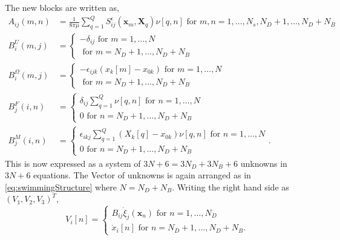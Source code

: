 The new blocks are written as,
\begin{equation*}
\begin{aligned}
A_{ij}(m,n) &= \frac{1}{8\pi\mu} \sum_{q=1}^Q S_{ij}^\epsilon (\bm{x}_m,\bm{X}_{q})\nu[q,n] \text { for } m,n = 1,\dots,N_s,N_D+1,\dots,N_D+N_B  \\
B_{i}^{U}(m,j) &= \begin{cases} -\delta_{ij} \text { for } m = 1,\dots,N \\ \text { for } m = N_D+1,\dots,N_D+N_B\end{cases}\\
B_{i}^{\Omega}(m,j) &= \begin{cases} -\epsilon_{ijk}(x_k[m]-x_{0k}) \text { for } m = 1,\dots,N \\ \text { for } m = N_D+1,\dots,N_D+N_B\end{cases}\\
B_{j}^{F}(i,n) &= \begin{cases} \delta_{ij} \sum_{q=1}^Q \nu[q,n] \text { for } n = 1,\dots,N \\ 0 \text { for } n = N_D+1,\dots,N_D+N_B\end{cases} \\
B_{j}^{M}(i,n) &= \begin{cases} \epsilon_{ikj} \sum_{q=1}^Q (X_k[q]-x_{0 k}) \nu[q,n] \text { for } n = 1,\dots,N \\ 0 \text { for } n = N_D+1,\dots,N_D+N_B\end{cases}.
\end{aligned}
\end{equation*}
This is now expressed as a system of $3N + 6 = 3N_D+3N_B + 6$ unknowns in $3N+6$ equations. The Vector of unknowns is again arranged as in \cref{eq:swimmingStructure} where $N=N_D+N_B$. Writing the right hand side as $(V_1,V_2,V_3)^T$,
\begin{equation*}
    V_i[n] = \begin{cases} B_{i j} \dot{\xi}_{j}({\bm{x}}_{n}) \text{ for } n=1,\dots,N_D \\ \dot{x}_i[n] \text{ for } n=N_D+1,\dots,N_D+N_B. \end{cases}
\end{equation*}

